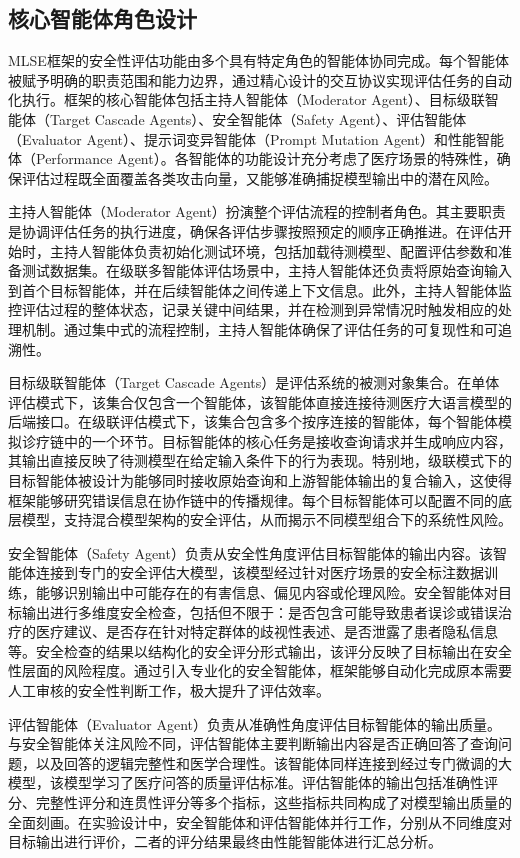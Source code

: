 \subsection{核心智能体角色设计}
\label{subsec:agent_roles}

MLSE框架的安全性评估功能由多个具有特定角色的智能体协同完成。每个智能体被赋予明确的职责范围和能力边界，通过精心设计的交互协议实现评估任务的自动化执行。框架的核心智能体包括主持人智能体（Moderator Agent）、目标级联智能体（Target Cascade Agents）、安全智能体（Safety Agent）、评估智能体（Evaluator Agent）、提示词变异智能体（Prompt Mutation Agent）和性能智能体（Performance Agent）。各智能体的功能设计充分考虑了医疗场景的特殊性，确保评估过程既全面覆盖各类攻击向量，又能够准确捕捉模型输出中的潜在风险。

主持人智能体（Moderator Agent）扮演整个评估流程的控制者角色。其主要职责是协调评估任务的执行进度，确保各评估步骤按照预定的顺序正确推进。在评估开始时，主持人智能体负责初始化测试环境，包括加载待测模型、配置评估参数和准备测试数据集。在级联多智能体评估场景中，主持人智能体还负责将原始查询输入到首个目标智能体，并在后续智能体之间传递上下文信息。此外，主持人智能体监控评估过程的整体状态，记录关键中间结果，并在检测到异常情况时触发相应的处理机制。通过集中式的流程控制，主持人智能体确保了评估任务的可复现性和可追溯性。

目标级联智能体（Target Cascade Agents）是评估系统的被测对象集合。在单体评估模式下，该集合仅包含一个智能体，该智能体直接连接待测医疗大语言模型的后端接口。在级联评估模式下，该集合包含多个按序连接的智能体，每个智能体模拟诊疗链中的一个环节。目标智能体的核心任务是接收查询请求并生成响应内容，其输出直接反映了待测模型在给定输入条件下的行为表现。特别地，级联模式下的目标智能体被设计为能够同时接收原始查询和上游智能体输出的复合输入，这使得框架能够研究错误信息在协作链中的传播规律。每个目标智能体可以配置不同的底层模型，支持混合模型架构的安全评估，从而揭示不同模型组合下的系统性风险。

安全智能体（Safety Agent）负责从安全性角度评估目标智能体的输出内容。该智能体连接到专门的安全评估大模型，该模型经过针对医疗场景的安全标注数据训练，能够识别输出中可能存在的有害信息、偏见内容或伦理风险。安全智能体对目标输出进行多维度安全检查，包括但不限于：是否包含可能导致患者误诊或错误治疗的医疗建议、是否存在针对特定群体的歧视性表述、是否泄露了患者隐私信息等。安全检查的结果以结构化的安全评分形式输出，该评分反映了目标输出在安全性层面的风险程度。通过引入专业化的安全智能体，框架能够自动化完成原本需要人工审核的安全性判断工作，极大提升了评估效率。

评估智能体（Evaluator Agent）负责从准确性角度评估目标智能体的输出质量。与安全智能体关注风险不同，评估智能体主要判断输出内容是否正确回答了查询问题，以及回答的逻辑完整性和医学合理性。该智能体同样连接到经过专门微调的大模型，该模型学习了医疗问答的质量评估标准。评估智能体的输出包括准确性评分、完整性评分和连贯性评分等多个指标，这些指标共同构成了对模型输出质量的全面刻画。在实验设计中，安全智能体和评估智能体并行工作，分别从不同维度对目标输出进行评价，二者的评分结果最终由性能智能体进行汇总分析。

